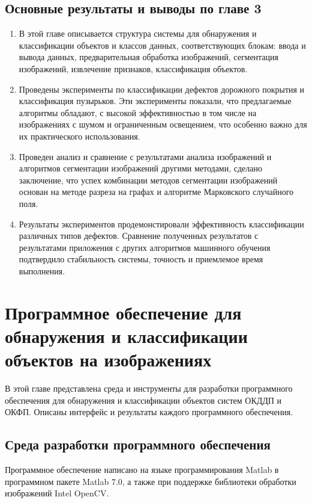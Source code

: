 \documentclass[a4paper,14pt]{extreport}
\begin{document}
\section{Основные результаты и выводы по главе 3}

\begin{enumerate}
	\item В этой главе описывается структура системы для обнаружения и классификации объектов и классов данных, соответствующих блокам: ввода и вывода данных, предварительная обработка изображений, сегментация изображений, извлечение признаков, классификация объектов.
\item Проведены эксперименты по классификации дефектов дорожного покрытия и классификация пузырьков. Эти эксперименты показали, что предлагаемые алгоритмы обладают, с высокой эффективностью в том числе на изображениях с шумом и ограниченным освещением, что особенно важно для их практического использования.
\item Проведен анализ и сравнение с результатами анализа изображений и алгоритмов сегментации изображений другими методами, сделано заключение, что успех комбинации методов сегментации изображений основан на методе разреза на графах и алгоритме Марковского случайного поля.
\item Результаты экспериментов продемонстировали эффективность классификации различных типов дефектов. Сравнение полученных результатов с результатами приложения с других алгоритмов машинного обучения подтвердило стабильность системы, точность и приемлемое время выполнения.

\end{enumerate}

\chapter{Программное обеспечение для обнаружения и классификации объектов на изображениях} \label{chapt4}
В этой главе представлена среда и инструменты для разработки программного обеспечения для обнаружения и классификации объектов систем ОКДДП и ОКФП. Описаны интерфейс и результаты каждого программного обеспечения.
\section{Среда разработки программного обеспечения}
Программное обеспечение написано на языке программирования Matlab в программном пакете Matlab 7.0, а также при поддержке библиотеки обработки изображений Intel OpenCV.
\end{document}
